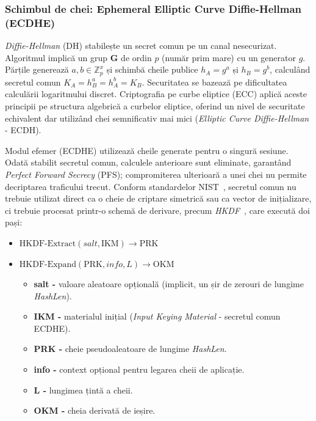 \subsubsection[Schimbul de chei (ECDHE)]{Schimbul de chei: Ephemeral Elliptic Curve Diffie-Hellman (ECDHE)}
\textit{Diffie-Hellman} (DH) stabilește un secret comun pe un canal nesecurizat. Algoritmul implică un grup $\mathbf{G}$ de ordin $p$ (număr prim mare) cu un generator $g$. Părțile generează $a, b \in \mathbb{Z}_{p}^{x}$ și schimbă cheile publice $h_A= g^{a}$ și $h_B= g^{b}$, calculând secretul comun $K_A=h_B^{a}=h_A^{b}=K_B$. Securitatea se bazează pe dificultatea calculării logaritmului discret. Criptografia pe curbe eliptice (ECC) aplică aceste principii pe structura algebrică a curbelor eliptice, oferind un nivel de securitate echivalent dar utilizând chei semnificativ mai mici (\textit{Elliptic Curve Diffie-Hellman} - ECDH).

Modul efemer (ECDHE) utilizează cheile generate pentru o singură sesiune. Odată stabilit secretul comun, calculele anterioare sunt eliminate, garantând \textit{Perfect Forward Secrecy} (PFS); compromiterea ulterioară a unei chei nu permite decriptarea traficului trecut. Conform standardelor NIST~\cite{nist_sp800_56Ar3}, secretul comun nu trebuie utilizat direct ca o cheie de criptare simetrică sau ca vector de inițializare, ci trebuie procesat printr-o schemă de derivare, precum \textit{HKDF}~\cite{rfc5869}, care execută doi pași:

\begin{itemize}
    \setlength{\itemsep}{0pt}
    \setlength{\parskip}{0pt}
    \item $\text{HKDF-Extract}(salt, \text{IKM}) \rightarrow \text{PRK}$
    \item $\text{HKDF-Expand}(\text{PRK}, info, L) \rightarrow \text{OKM}$
    \begin{itemize}
        \setlength{\itemsep}{0pt}
        \setlength{\parskip}{0pt}
        \item \textbf{salt -} valoare aleatoare opțională (implicit, un șir de zerouri de lungime \textit{HashLen}).
        \item \textbf{IKM -} materialul inițial (\textit{Input Keying Material} - secretul comun ECDHE).
        \item \textbf{PRK -} cheie pseudoaleatoare de lungime \textit{HashLen}.
        \item \textbf{info -} context opțional pentru legarea cheii de aplicație.
        \item \textbf{L -} lungimea țintă a cheii.
        \item \textbf{OKM -} cheia derivată de ieșire.
    \end{itemize}
\end{itemize}

